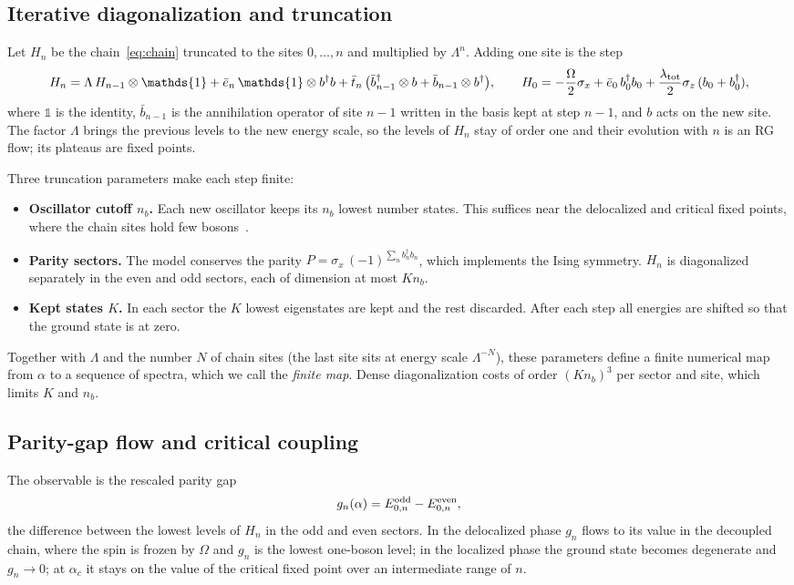 \documentclass[10pt,a4paper]{article}
\newcommand{\one}{\mathds{1}}
\begin{document}
\subsection{Iterative diagonalization and truncation}
Let $H_n$ be the chain~\eqref{eq:chain} truncated to the sites $0,\dots,n$ and multiplied by $\Lambda^n$. Adding one site is the step
\begin{equation}
H_{n}=\Lambda\,H_{n-1}\otimes\one+\bar e_n\,\one\otimes b^\dagger b
+\bar t_n\,\big(\bar b_{n-1}^\dagger\otimes b+\bar b_{n-1}\otimes b^\dagger\big),\qquad
H_0=-\frac{\Omega}{2}\sigma_x+\bar e_0\,b_0^\dagger b_0+\frac{\lambda_{\rm tot}}{2}\sigma_z\,(b_0+b_0^\dagger),
\label{eq:step}
\end{equation}
where $\one$ is the identity, $\bar b_{n-1}$ is the annihilation operator of site $n-1$ written in the basis kept at step $n-1$, and
$b$ acts on the new site. The factor $\Lambda$ brings the previous levels to the new energy scale, so the levels of $H_n$ stay of order
one and their evolution with $n$ is an RG flow; its plateaus are fixed points.

Three truncation parameters make each step finite:
\begin{itemize}
\item \textbf{Oscillator cutoff $n_b$.} Each new oscillator keeps its $n_b$ lowest number states. This suffices near the
  delocalized and critical fixed points, where the chain sites hold few bosons~\cite{Bulla2005}.
\item \textbf{Parity sectors.} The model conserves the parity $P=\sigma_x\,(-1)^{\sum_nb_n^\dagger b_n}$, which implements the Ising
  symmetry. $H_n$ is diagonalized separately in the even and odd sectors, each of dimension at most $Kn_b$.
\item \textbf{Kept states $K$.} In each sector the $K$ lowest eigenstates are kept and the rest discarded. After each step all
  energies are shifted so that the ground state is at zero.
\end{itemize}
Together with $\Lambda$ and the number $N$ of chain sites (the last site sits at energy scale $\Lambda^{-N}$), these parameters
define a finite numerical map from $\alpha$ to a sequence of spectra, which we call the \emph{finite map}. Dense diagonalization costs
of order $(Kn_b)^3$ per sector and site, which limits $K$ and $n_b$.

\subsection{Parity-gap flow and critical coupling}\label{sec:critical}
The observable is the rescaled parity gap
\begin{equation}
g_n(\alpha)=E^{\rm odd}_{0,n}-E^{\rm even}_{0,n},
\end{equation}
the difference between the lowest levels of $H_n$ in the odd and even sectors. In the delocalized phase $g_n$ flows to its value in
the decoupled chain, where the spin is frozen by $\Omega$ and $g_n$ is the lowest one-boson level; in the localized phase the ground
state becomes degenerate and $g_n\to0$; at $\alpha_c$ it stays on the value of the critical fixed point over an intermediate range
of $n$.
\end{document}
